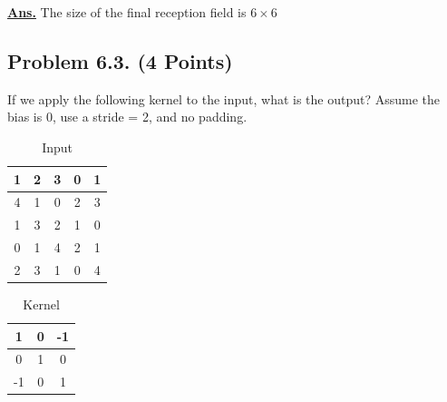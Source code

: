 \documentclass[12pt, a4paper]{article}
\begin{document}
            \vspace{1em}

            \noindent \underline{\textbf{Ans.}} The size of the final reception field is $6 \times 6$

    \pagebreak

        \subsection{Problem 6.3. (4 Points)}
            If we apply the following kernel to the input, what is the output? Assume the bias is 0, use a stride = 2, and no padding.
            \begin{table}[h]
                \centering
                \begin{tabular}{|c|c|c|c|c|}
                    \hline
                    1 & 2 & 3 & 0 & 1 \\
                    \hline
                    4 & 1 & 0 & 2 & 3 \\
                    \hline
                    1 & 3 & 2 & 1 & 0 \\
                    \hline
                    0 & 1 & 4 & 2 & 1 \\
                    \hline
                    2 & 3 & 1 & 0 & 4 \\
                    \hline
                \end{tabular}
                \caption{Input}
            \end{table}

            \begin{table}[h]
                \centering
                \begin{tabular}{|c|c|c|}
                    \hline
                    1 & 0 & -1 \\
                    \hline
                    0 & 1 & 0 \\
                    \hline
                    -1 & 0 & 1 \\
                    \hline
                \end{tabular}
                \caption{Kernel}
            \end{table}
\end{document}

